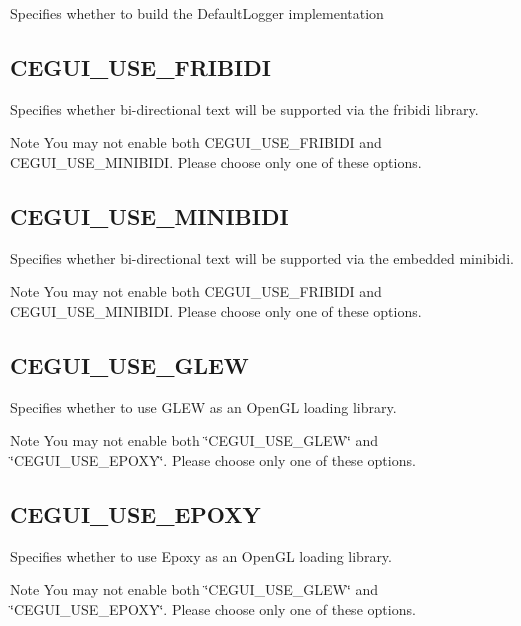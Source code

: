 Specifies whether to build the Default\+Logger implementation \hypertarget{build_options_build_options_use_fribidi}{}\subsection{C\+E\+G\+U\+I\+\_\+\+U\+S\+E\+\_\+\+F\+R\+I\+B\+I\+DI}\label{build_options_build_options_use_fribidi}
Specifies whether bi-\/directional text will be supported via the fribidi library. \begin{DoxyNote}{Note}
You may not enable both C\+E\+G\+U\+I\+\_\+\+U\+S\+E\+\_\+\+F\+R\+I\+B\+I\+DI and C\+E\+G\+U\+I\+\_\+\+U\+S\+E\+\_\+\+M\+I\+N\+I\+B\+I\+DI. Please choose only one of these options. 
\end{DoxyNote}
\hypertarget{build_options_build_options_use_minibidi}{}\subsection{C\+E\+G\+U\+I\+\_\+\+U\+S\+E\+\_\+\+M\+I\+N\+I\+B\+I\+DI}\label{build_options_build_options_use_minibidi}
Specifies whether bi-\/directional text will be supported via the embedded minibidi. \begin{DoxyNote}{Note}
You may not enable both C\+E\+G\+U\+I\+\_\+\+U\+S\+E\+\_\+\+F\+R\+I\+B\+I\+DI and C\+E\+G\+U\+I\+\_\+\+U\+S\+E\+\_\+\+M\+I\+N\+I\+B\+I\+DI. Please choose only one of these options. 
\end{DoxyNote}
\hypertarget{build_options_build_options_use_glew}{}\subsection{C\+E\+G\+U\+I\+\_\+\+U\+S\+E\+\_\+\+G\+L\+EW}\label{build_options_build_options_use_glew}
Specifies whether to use G\+L\+EW as an Open\+GL loading library. \begin{DoxyNote}{Note}
You may not enable both \char`\"{}\+C\+E\+G\+U\+I\+\_\+\+U\+S\+E\+\_\+\+G\+L\+E\+W\char`\"{} and \char`\"{}\+C\+E\+G\+U\+I\+\_\+\+U\+S\+E\+\_\+\+E\+P\+O\+X\+Y\char`\"{}. Please choose only one of these options. 
\end{DoxyNote}
\hypertarget{build_options_build_options_use_epoxy}{}\subsection{C\+E\+G\+U\+I\+\_\+\+U\+S\+E\+\_\+\+E\+P\+O\+XY}\label{build_options_build_options_use_epoxy}
Specifies whether to use Epoxy as an Open\+GL loading library. \begin{DoxyNote}{Note}
You may not enable both \char`\"{}\+C\+E\+G\+U\+I\+\_\+\+U\+S\+E\+\_\+\+G\+L\+E\+W\char`\"{} and \char`\"{}\+C\+E\+G\+U\+I\+\_\+\+U\+S\+E\+\_\+\+E\+P\+O\+X\+Y\char`\"{}. Please choose only one of these options. 
\end{DoxyNote}
